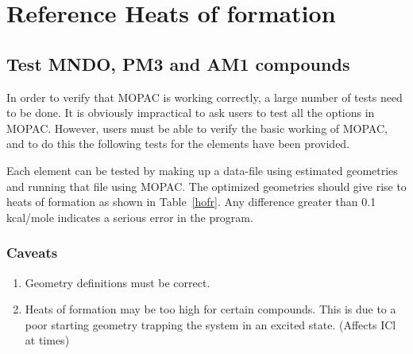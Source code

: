 \chapter{Reference Heats of formation}
\section*{Test MNDO, PM3 and AM1 compounds}
In order to verify that MOPAC is working correctly, a large  number of  tests
need to be done.   It  is  obviously impractical  to ask users to test all the
options in MOPAC.   However, users must be able to verify the basic working of
MOPAC, and to do this  the  following  tests for the elements have been
provided.

Each element can be tested by making up a data-file using estimated geometries
and running that file using MOPAC.  The optimized geometries should give rise
to heats of formation as shown in Table~\ref{hofr}.   Any difference greater
than 0.1 kcal/mole indicates a serious error  in the program. 

\subsection*{Caveats}
\begin{enumerate}
\item Geometry definitions must be correct.
\item Heats of formation  may  be  too  high  for  certain compounds.   This is
due to a poor starting geometry trapping the system in an excited  state.
(Affects ICl at times)
\end{enumerate}

